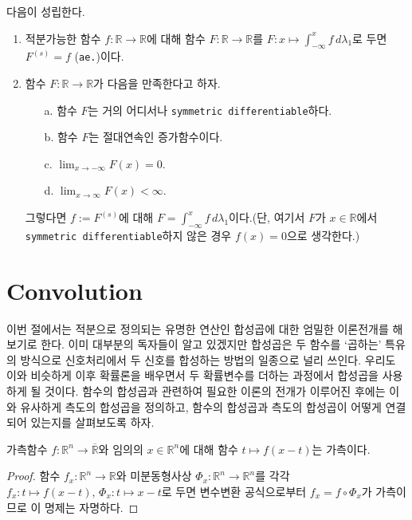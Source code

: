 \begin{theorem}
    다음이 성립한다.
    \begin{enumerate}
        \item 적분가능한 함수 $f:\mathbb{R}\to\mathbb{R}$에 대해 함수 $F:\mathbb{R}\to\mathbb{R}$를 $F:x\mapsto\int_{-\infty}^xf\,d\lambda_1$로 두면 $F^{(s)}=f$ (\texttt{ae.})이다.
        \item 함수 $F:\mathbb{R}\to\mathbb{R}$가 다음을 만족한다고 하자.
        \begin{enumerate}
            \item[a.] 함수 $F$는 거의 어디서나 \texttt{symmetric differentiable}하다.
            \item[b.] 함수 $F$는 절대연속인 증가함수이다.
            \item[c.] $\lim_{x\to-\infty}F(x)=0$.
            \item[d.] $\lim_{x\to\infty}F(x)<\infty$.
        \end{enumerate}
        그렇다면 $f:=F^{(s)}$에 대해 $F=\int_{-\infty}^xf\,d\lambda_1$이다.(단, 여기서 $F$가 $x\in\mathbb{R}$에서 \texttt{symmetric differentiable}하지 않은 경우 $f(x)=0$으로 생각한다.)
    \end{enumerate}
\end{theorem}

\section{Convolution}

이번 절에서는 적분으로 정의되는 유명한 연산인 합성곱에 대한 엄밀한 이론전개를 해 보기로 한다. 이미 대부분의 독자들이 알고 있겠지만 합성곱은 두 함수를 `곱하는' 특유의 방식으로 신호처리에서 두 신호를 합성하는 방법의 일종으로 널리 쓰인다. 우리도 이와 비슷하게 이후 확률론을 배우면서 두 확률변수를 더하는 과정에서 합성곱을 사용하게 될 것이다. 함수의 합성곱과 관련하여 필요한 이론의 전개가 이루어진 후에는 이와 유사하게 측도의 합성곱을 정의하고, 함수의 합성곱과 측도의 합성곱이 어떻게 연결되어 있는지를 살펴보도록 하자.

\begin{proposition}\label{prop:convolutionMeasurable}
    가측함수 $f:\mathbb{R}^n\to\overline{\mathbb{R}}$와 임의의 $x\in\mathbb{R}^n$에 대해 함수 $t\mapsto f(x-t)$는 가측이다.
\end{proposition}

\begin{proof}
    함수 $f_x:\mathbb{R}^n\to\mathbb{R}$와 미분동형사상 $\Phi_x:\mathbb{R}^n\to\mathbb{R}^n$를 각각 $f_x:t\mapsto f(x-t),\,\Phi_x:t\mapsto x-t$로 두면 변수변환 공식으로부터 $f_x=f\circ\Phi_x$가 가측이므로 이 명제는 자명하다.
\end{proof}

